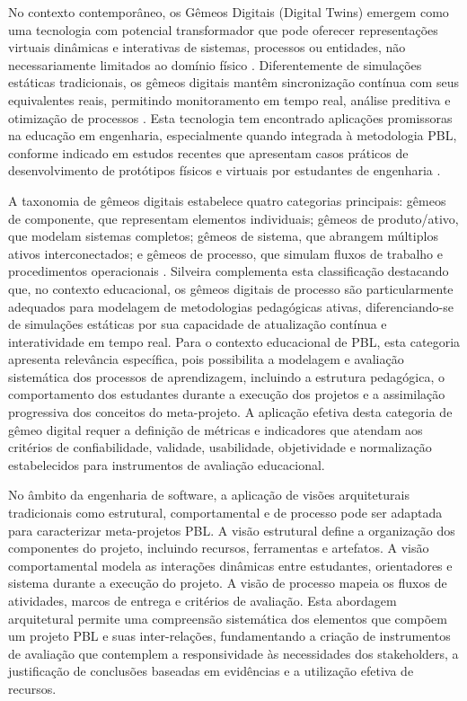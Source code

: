 \documentclass[12pt,a4paper]{article}
\begin{document}
No contexto contemporâneo, os Gêmeos Digitais (Digital Twins) emergem como uma tecnologia com potencial transformador que pode oferecer representações virtuais dinâmicas e interativas de sistemas, processos ou entidades, não necessariamente limitados ao domínio físico \cite{grieves2014, tao2018}. Diferentemente de simulações estáticas tradicionais, os gêmeos digitais mantêm sincronização contínua com seus equivalentes reais, permitindo monitoramento em tempo real, análise preditiva e otimização de processos \cite{silveira2024panorama}. Esta tecnologia tem encontrado aplicações promissoras na educação em engenharia, especialmente quando integrada à metodologia PBL, conforme indicado em estudos recentes que apresentam casos práticos de desenvolvimento de protótipos físicos e virtuais por estudantes de engenharia \cite{bachmann2023}.

A taxonomia de gêmeos digitais estabelece quatro categorias principais: gêmeos de componente, que representam elementos individuais; gêmeos de produto/ativo, que modelam sistemas completos; gêmeos de sistema, que abrangem múltiplos ativos interconectados; e gêmeos de processo, que simulam fluxos de trabalho e procedimentos operacionais \cite{barricelli2019}. Silveira \cite{silveira2024panorama} complementa esta classificação destacando que, no contexto educacional, os gêmeos digitais de processo são particularmente adequados para modelagem de metodologias pedagógicas ativas, diferenciando-se de simulações estáticas por sua capacidade de atualização contínua e interatividade em tempo real. Para o contexto educacional de PBL, esta categoria apresenta relevância específica, pois possibilita a modelagem e avaliação sistemática dos processos de aprendizagem, incluindo a estrutura pedagógica, o comportamento dos estudantes durante a execução dos projetos e a assimilação progressiva dos conceitos do meta-projeto. A aplicação efetiva desta categoria de gêmeo digital requer a definição de métricas e indicadores que atendam aos critérios de confiabilidade, validade, usabilidade, objetividade e normalização estabelecidos para instrumentos de avaliação educacional.

No âmbito da engenharia de software, a aplicação de visões arquiteturais tradicionais como estrutural, comportamental e de processo pode ser adaptada para caracterizar meta-projetos PBL. A visão estrutural define a organização dos componentes do projeto, incluindo recursos, ferramentas e artefatos. A visão comportamental modela as interações dinâmicas entre estudantes, orientadores e sistema durante a execução do projeto. A visão de processo mapeia os fluxos de atividades, marcos de entrega e critérios de avaliação. Esta abordagem arquitetural permite uma compreensão sistemática dos elementos que compõem um projeto PBL e suas inter-relações, fundamentando a criação de instrumentos de avaliação que contemplem a responsividade às necessidades dos stakeholders, a justificação de conclusões baseadas em evidências e a utilização efetiva de recursos.
\end{document}
